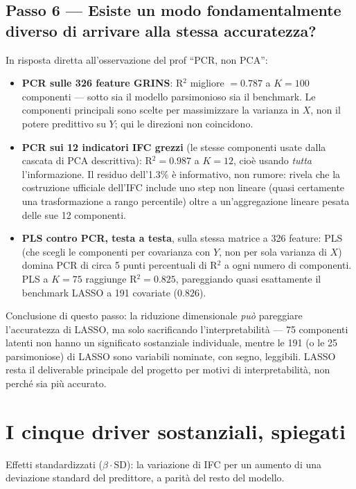 \documentclass[11pt,a4paper]{article}
\begin{document}
\subsection*{Passo 6 --- Esiste un modo fondamentalmente diverso di
arrivare alla stessa accuratezza?}
In risposta diretta all'osservazione del prof ``PCR, non PCA'':
\begin{itemize}[leftmargin=2em]
  \item \textbf{PCR sulle 326 feature GRINS}: R$^2$ migliore $=
  0.787$ a $K=100$ componenti --- sotto sia il modello parsimonioso
  sia il benchmark. Le componenti principali sono scelte per
  massimizzare la varianza in $X$, non il potere predittivo su $Y$;
  qui le direzioni non coincidono.
  \item \textbf{PCR sui 12 indicatori IFC grezzi} (le stesse
  componenti usate dalla cascata di PCA descrittiva): R$^2 = 0.987$
  a $K=12$, cioè usando \emph{tutta} l'informazione. Il residuo
  dell'1.3\% è informativo, non rumore: rivela che la costruzione
  ufficiale dell'IFC include uno step non lineare (quasi certamente
  una trasformazione a rango percentile) oltre a un'aggregazione
  lineare pesata delle sue 12 componenti.
  \item \textbf{PLS contro PCR, testa a testa}, sulla stessa matrice
  a 326 feature: PLS (che scegli le componenti per covarianza con
  $Y$, non per sola varianza di $X$) domina PCR di circa 5 punti
  percentuali di R$^2$ a ogni numero di componenti. PLS a $K=75$
  raggiunge R$^2=0.825$, pareggiando quasi esattamente il benchmark
  LASSO a 191 covariate ($0.826$).
\end{itemize}
Conclusione di questo passo: la riduzione dimensionale \emph{può}
pareggiare l'accuratezza di LASSO, ma solo sacrificando
l'interpretabilità --- 75 componenti latenti non hanno un significato
sostanziale individuale, mentre le 191 (o le 25 parsimoniose) di
LASSO sono variabili nominate, con segno, leggibili. LASSO resta il
deliverable principale del progetto per motivi di interpretabilità,
non perché sia più accurato.

\section{I cinque driver sostanziali, spiegati}

Effetti standardizzati ($\beta \cdot \mathrm{SD}$): la variazione di
IFC per un aumento di una deviazione standard del predittore, a
parità del resto del modello.
\end{document}
